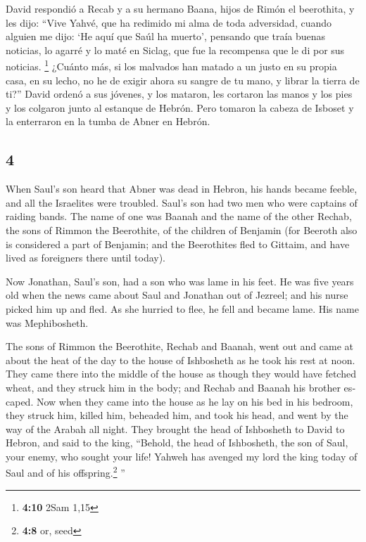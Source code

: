 \begin{paracol}{2}
 David respondió a Recab y a su hermano Baana, hijos de
Rimón el beerothita, y les dijo: ``Vive Yahvé, que ha redimido mi alma
de toda adversidad,  cuando alguien me dijo: `He aquí que
Saúl ha muerto', pensando que traía buenas noticias, lo agarré y lo maté
en Siclag, que fue la recompensa que le di por sus noticias. \footnote{\textbf{4:10}
  2Sam 1,15}  ¿Cuánto más, si los malvados han matado a
un justo en su propia casa, en su lecho, no he de exigir ahora su sangre
de tu mano, y librar la tierra de ti?''  David ordenó a
sus jóvenes, y los mataron, les cortaron las manos y los pies y los
colgaron junto al estanque de Hebrón. Pero tomaron la cabeza de Isboset
y la enterraron en la tumba de Abner en Hebrón.

\switchcolumn
\begin{otherlanguage}{english}

\hypertarget{section-7}{%
\section{4}\label{section-7}}

 When Saul's son heard that Abner was dead in Hebron, his
hands became feeble, and all the Israelites were troubled.
 Saul's son had two men who were captains of raiding
bands. The name of one was Baanah and the name of the other Rechab, the
sons of Rimmon the Beerothite, of the children of Benjamin (for Beeroth
also is considered a part of Benjamin;  and the
Beerothites fled to Gittaim, and have lived as foreigners there until
today).

 Now Jonathan, Saul's son, had a son who was lame in his
feet. He was five years old when the news came about Saul and Jonathan
out of Jezreel; and his nurse picked him up and fled. As she hurried to
flee, he fell and became lame. His name was Mephibosheth.

 The sons of Rimmon the Beerothite, Rechab and Baanah,
went out and came at about the heat of the day to the house of
Ishbosheth as he took his rest at noon.  They came there
into the middle of the house as though they would have fetched wheat,
and they struck him in the body; and Rechab and Baanah his brother
escaped.  Now when they came into the house as he lay on
his bed in his bedroom, they struck him, killed him, beheaded him, and
took his head, and went by the way of the Arabah all night.
 They brought the head of Ishbosheth to David to Hebron,
and said to the king, ``Behold, the head of Ishbosheth, the son of Saul,
your enemy, who sought your life! Yahweh has avenged my lord the king
today of Saul and of his offspring.\footnote{\textbf{4:8} or, seed} ''


\end{otherlanguage}
\end{paracol}
